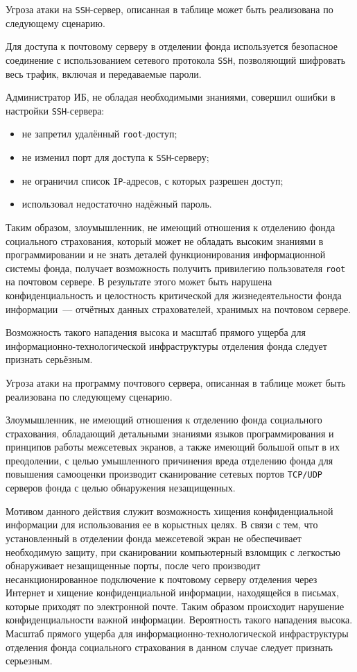 \point Угроза атаки на \texttt{SSH}-сервер, описанная в таблице может
быть реализована по следующему сценарию.

\point Для доступа к почтовому серверу в отделении фонда используется
безопасное соединение с использованием сетевого протокола
\texttt{SSH}, позволяющий шифровать весь трафик, включая и
передаваемые пароли.

Администратор ИБ, не обладая необходимыми знаниями, совершил ошибки в
настройки \texttt{SSH}-сервера:

\begin{itemize}
\item не запретил удалённый \texttt{root}-доступ;
\item не изменил порт для доступа к \texttt{SSH}-серверу;
\item не ограничил список \texttt{IP}-адресов, с которых разрешен
  доступ;
\item использовал недостаточно надёжный пароль.
\end{itemize}

Таким образом, злоумышленник, не имеющий отношения к отделению фонда
социального страхования, который может не обладать высоким знаниями в
программировании и не знать деталей функционирования информационной
системы фонда, получает возможность получить привилегию пользователя
\texttt{root} на почтовом сервере. В результате этого может быть
нарушена конфиденциальность и целостность критической для
жизнедеятельности фонда информации~--- отчётных данных страхователей,
хранимых на почтовом сервере.

Возможность такого нападения высока и масштаб прямого ущерба для
информационно-технологической инфраструктуры отделения фонда следует
признать серьёзным.

\point Угроза атаки на программу почтового сервера, описанная в
таблице может быть реализована по следующему сценарию.

\point Злоумышленник, не имеющий отношения к отделению фонда
социального страхования, обладающий детальными знаниями языков
программирования и принципов работы межсетевых экранов, а также
имеющий большой опыт в их преодолении, с целью умышленного причинения
вреда отделению фонда для повышения самооценки производит сканирование
сетевых портов \texttt{TCP/UDP} серверов фонда с целью обнаружения
незащищенных.

Мотивом данного действия служит возможность хищения конфиденциальной
информации для использования ее в корыстных целях. В связи с тем, что
установленный в отделении фонда межсетевой экран не обеспечивает
необходимую защиту, при сканировании компьютерный взломщик с легкостью
обнаруживает незащищенные порты, после чего производит
несанкционированное подключение к почтовому серверу отделения через
Интернет и хищение конфиденциальной информации, находящейся в письмах,
которые приходят по электронной почте. Таким образом происходит
нарушение конфиденциальности важной информации. Вероятность такого
нападения высока. Масштаб прямого ущерба для
информационно-технологической инфраструктуры отделения фонда
социального страхования в данном случае следует признать серьезным.

